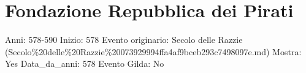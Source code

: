 \section{Fondazione Repubblica dei
Pirati}\label{fondazione-repubblica-dei-pirati}

Anni: 578-590 Inizio: 578 Evento originario: Secolo delle Razzie
(Secolo\%20delle\%20Razzie\%20073929994ffa4af9bceb293c7498097e.md)
Mostra: Yes Data\_da\_anni: 578 Evento Gilda: No
